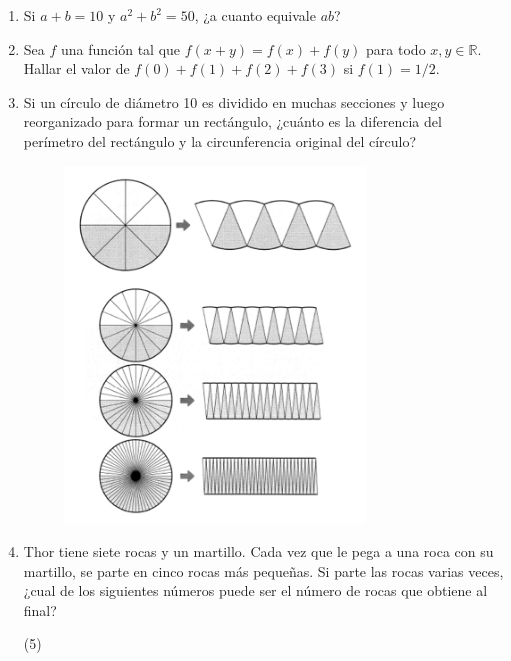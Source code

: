 \documentclass{article}
\begin{document}
\begin{enumerate}
{\begin{center}
\end{center}}
    \item Si $a + b = 10$ y $a^2 + b^2 = 50$, ¿a cuanto equivale $ab$?
    \item Sea $f$ una función tal que $f(x + y) = f(x) + f(y)$ para todo $x, y \in \mathbb{R}$. Hallar el valor de  $f(0) + f(1) + f(2) + f(3)$ si $f(1) = 1/2$.
          \newpage
    \item{Si un círculo de diámetro 10 es dividido en muchas secciones y luego reorganizado para formar un rectángulo, ¿cuánto es la diferencia del perímetro del rectángulo y la circunferencia original del círculo?
          \begin{figure}[h]
              \centering
              \includegraphics[width=8cm]{images/circleapprox.jpg} %
              \label{fig:my_label}
          \end{figure}
          }
    \item Thor tiene siete rocas y un martillo. Cada vez que le pega a una roca con su martillo, se parte en cinco rocas más pequeñas. Si parte las rocas varias veces, ¿cual de los siguientes números puede ser el número de rocas que obtiene al final? \\ \begin{tasks}[label=\Alph*.](5)

\end{tasks}
\end{enumerate}
\end{document}
